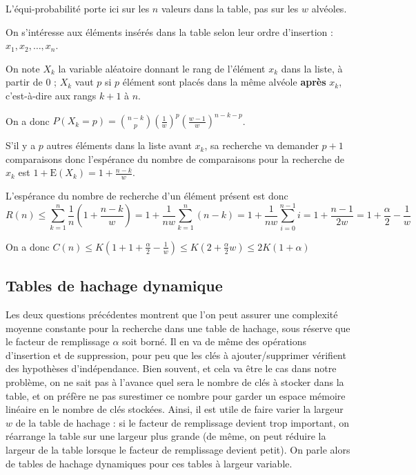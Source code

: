 \begin{Answer} L'équi-probabilité porte ici sur les $n$ valeurs dans la table, pas sur les $w$ alvéoles.

On s'intéresse aux éléments insérés dans la table selon leur ordre d'insertion : $x_1, x_2, \ldots, x_n$.

On note $X_k$ la variable aléatoire donnant le rang de l'élément $x_k$ dans la liste, à partir de 0 ; $X_k$ vaut $p$ si $p$ élément sont placés dans la même alvéole {\bf après} $x_k$, c'est-à-dire aux rangs $k+1$ à $n$. 

On a donc $\displaystyle P(X_k=p) =\binom {n-k}p\left(\frac 1w\right)^p\left(\frac {w-1}w\right)^{n-k-p}$.

S'il y a $p$ autres éléments dans la liste avant $x_k$, sa recherche va demander $p+1$ comparaisons donc l'espérance du nombre de comparaisons pour la recherche de $x_k$ est $1+\text{E}(X_k)= 1 + \frac{n-k}w$.

L'espérance du nombre de recherche d'un élément présent est donc
\[R(n) \le \sum_{k=1}^{n}\frac 1n \left(1 + \frac{n-k}w\right)
=1+\frac 1{nw}\sum_{k=1}^{n}(n-k)
=1+\frac 1{nw}\sum_{i=0}^{n-1}i
=1+\frac {n-1}{2w}
=1+\frac \alpha 2 - \frac 1w\]

On a donc $C(n) \le K\left(1+1+\frac \alpha 2 - \frac 1w\right)
\le K\left(2+\frac \alpha 2 w\right)
\le 2K(1+\alpha)$
\end{Answer}
\newpage
\subsection{Tables de hachage dynamique}
Les deux questions précédentes montrent que l’on peut assurer une
complexité moyenne
constante pour la recherche dans une table de hachage,
sous réserve que le facteur de remplissage $\alpha$ soit borné. Il en va
de même des opérations d’insertion et de suppression, pour peu que les
clés à ajouter/supprimer vérifient des hypothèses d’indépendance. Bien
souvent, et cela va être le cas dans notre problème, on ne sait pas à
l’avance quel sera le nombre de clés à stocker dans la table, et on
préfère ne pas surestimer ce nombre pour garder un espace mémoire
linéaire en le nombre de clés stockées. Ainsi, il est utile de faire
varier la largeur $w$ de la table de hachage : si le facteur de
remplissage devient trop important, on réarrange la table sur une
largeur plus grande (de même, on peut réduire la largeur de la table
lorsque le facteur de remplissage devient petit). On parle alors de
tables de hachage dynamiques pour ces tables à largeur
variable.

